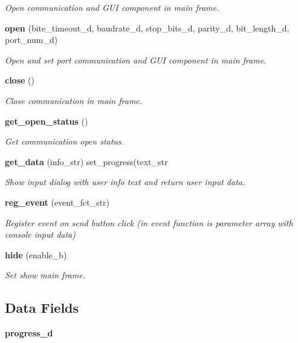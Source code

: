 \begin{DoxyCompactItemize}
\begin{DoxyCompactList}\small\item\em Open communication and G\+UI component in main frame. \end{DoxyCompactList}\item 
\textbf{ open} (bite\+\_\+timeout\+\_\+d, baudrate\+\_\+d, stop\+\_\+bits\+\_\+d, parity\+\_\+d, bit\+\_\+length\+\_\+d, port\+\_\+num\+\_\+d)
\begin{DoxyCompactList}\small\item\em Open and set port communication and G\+UI component in main frame. \end{DoxyCompactList}\item 
\textbf{ close} ()
\begin{DoxyCompactList}\small\item\em Close communication in main frame. \end{DoxyCompactList}\item 
\textbf{ get\+\_\+open\+\_\+status} ()
\begin{DoxyCompactList}\small\item\em Get communication open status. \end{DoxyCompactList}\item 
\textbf{ get\+\_\+data} (info\+\_\+str) set\+\_\+progress(text\+\_\+str
\begin{DoxyCompactList}\small\item\em Show input dialog with user info text and return user input data. \end{DoxyCompactList}\item 
\textbf{ reg\+\_\+event} (event\+\_\+fct\+\_\+str)
\begin{DoxyCompactList}\small\item\em Register event on send button click (in event function is parameter array with console input data) \end{DoxyCompactList}\item 
\textbf{ hide} (enable\+\_\+b)
\begin{DoxyCompactList}\small\item\em Set show main frame. \end{DoxyCompactList}\end{DoxyCompactItemize}
\subsection*{Data Fields}
\begin{DoxyCompactItemize}
\item 
\mbox{\label{classmain__frame_aa3e8365c54a730c0b8806fdd9b158d31}} 
{\bfseries progress\+\_\+d}
\end{DoxyCompactItemize}


